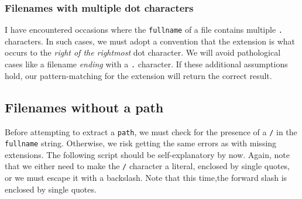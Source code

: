 \documentclass[
  a4paper,
]{article}
\newenvironment{Shaded}{\begin{snugshade}}{\end{snugshade}}
\newcommand{\AttributeTok}[1]{\textcolor[rgb]{0.80,0.80,0.80}{#1}}
\newcommand{\BuiltInTok}[1]{\textcolor[rgb]{0.80,0.80,0.80}{#1}}
\newcommand{\CommentTok}[1]{\textcolor[rgb]{0.50,0.62,0.50}{#1}}
\newcommand{\ControlFlowTok}[1]{\textcolor[rgb]{0.94,0.87,0.69}{#1}}
\newcommand{\KeywordTok}[1]{\textcolor[rgb]{0.94,0.87,0.69}{#1}}
\newcommand{\NormalTok}[1]{\textcolor[rgb]{0.80,0.80,0.80}{#1}}
\newcommand{\OperatorTok}[1]{\textcolor[rgb]{0.94,0.94,0.82}{#1}}
\newcommand{\OtherTok}[1]{\textcolor[rgb]{0.94,0.94,0.56}{#1}}
\newcommand{\PreprocessorTok}[1]{\textcolor[rgb]{1.00,0.81,0.69}{\textbf{#1}}}
\newcommand{\StringTok}[1]{\textcolor[rgb]{0.80,0.58,0.58}{#1}}
\newcommand{\VariableTok}[1]{\textcolor[rgb]{0.80,0.80,0.80}{#1}}
\begin{document}
\hypertarget{filenames-with-multiple-dot-characters}{%
\subsubsection{Filenames with multiple dot
characters}\label{filenames-with-multiple-dot-characters}}

I have encountered occasions where the \texttt{fullname} of a file
contains multiple \texttt{.} characters. In such cases, we must adopt a
convention that the extension is what occurs to the \emph{right of the
rightmost} dot character. We will avoid pathological cases like a
filename \emph{ending} with a \texttt{.} character. If these additional
assumptions hold, our pattern-matching for the extension will return the
correct result.

\hypertarget{filenames-without-a-path}{%
\subsection{Filenames without a path}\label{filenames-without-a-path}}

Before attempting to extract a \texttt{path}, we must check for the
presence of a \texttt{/} in the \texttt{fullname} string. Otherwise, we
risk getting the same errors as with missing extensions. The following
script should be self-explanatory by now. Again, note that we either
need to make the \texttt{/} character a literal, enclosed by single
quotes, or we must escape it with a backslash. Note that this time,the
forward slash is enclosed by single quotes.

\begin{Shaded}
\end{Shaded}
\end{document}
